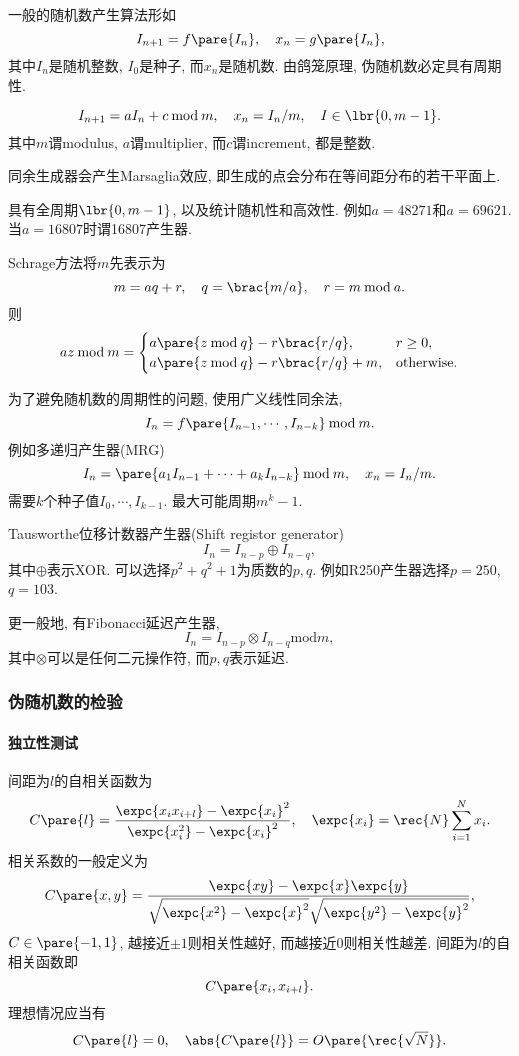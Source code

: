 \documentclass[hidelinks]{ctexart}
\renewcommand{\mod}{\mathbin{\mathrm{mod}}}
\begin{document}
一般的随机数产生算法形如
\[ I_{n+1} = f\pare{I_n},\quad x_n = g\pare{I_n}, \]
其中$I_n$是随机整数, $I_0$是种子, 而$x_n$是随机数. 由鸽笼原理, 伪随机数必定具有周期性.
\begin{definition}
    \[ I_{n+1} = aI_n + c \mod m,\quad x_n = I_n / m,\quad I \in \lbr{0,m-1}. \]
    其中$m$谓modulus, $a$谓multiplier, 而$c$谓increment, 都是整数.
\end{definition}
同余生成器会产生Marsaglia效应, 即生成的点会分布在等间距分布的若干平面上.
\begin{definition}[16807产生器]
    具有全周期$\lbr{0,m-1}$, 以及统计随机性和高效性. 例如$a=48271$和$a=69621$. 当$a=16807$时谓16807产生器.
\end{definition}
Schrage方法将$m$先表示为
\[ m = aq + r,\quad q = \brac{m/a},\quad r = m \mod a. \]
则
\begin{equation*}
    az \mod m = \begin{cases}
        a\pare{z\mod q} - r\brac{r/q}, & r\ge 0,\\
        a\pare{z\mod q} - r\brac{r/q} + m, & \mathrm{otherwise}.
    \end{cases}
\end{equation*}
\par
为了避免随机数的周期性的问题, 使用广义线性同余法,
\[ I_n = f\pare{I_{n-1},\cdots,I_{n-k}} \mod m. \]
例如多递归产生器(MRG)
\[ I_n = \pare{a_1I_{n-1} + \cdots + a_k I_{n-k}}\mod m, \quad x_n = I_n/m. \]
需要$k$个种子值$I_{0},\cdots,I_{k-1}$. 最大可能周期$m^k - 1$.
\par
Tausworthe位移计数器产生器(Shift registor generator)
\[ I_n = I_{n-p} \oplus I_{n-q}, \]
其中$\oplus$表示XOR. 可以选择$p^2+q^2+1$为质数的$p,q$. 例如R250产生器选择$p=250$, $q=103$.
\par
更一般地, 有Fibonacci延迟产生器,
\[ I_n = I_{n-p} \otimes I_{n-q} \mod m, \]
其中$\otimes$可以是任何二元操作符, 而$p,q$表示延迟.


\subsubsection{伪随机数的检验} %
\label{ssub:伪随机数的检验}

\paragraph{独立性测试} %
\label{par:独立性测试}

间距为$l$的自相关函数为
\[ C\pare{l} = \frac{\expc{x_i x_{i+l}} - \expc{x_i}^2}{\expc{x_i^2} - \expc{x_i}^2},\quad \expc{x_i} = \rec{N}\sum_{i=1}^N x_i. \]
相关系数的一般定义为
\[ C\pare{x,y} = \frac{\expc{xy} - \expc{x}\expc{y}}{\sqrt{\expc{x^2} - \expc{x}^2} \sqrt{\expc{y^2} - \expc{y}^2}}, \]
$C\in \pare{-1,1}$, 越接近$\pm 1$则相关性越好, 而越接近$0$则相关性越差. 间距为$l$的自相关函数即
\[ C\pare{x_i, x_{i+l}}. \]
理想情况应当有
\[ C\pare{l} = 0,\quad \abs{C\pare{l}} = O\pare{\rec{\sqrt{N}}}. \]
\end{document}
